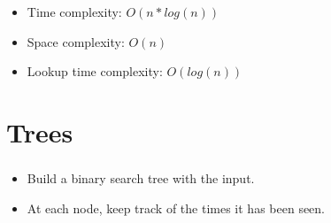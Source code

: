 \documentclass[table]{beamer}
\makeatletter
\newcommand*{\currentname}{\@currentlabelname}
\makeatother
\begin{document}
\begin{frame}
    \frametitle{\currentname}
        \begin{itemize}
            \item Time complexity: $O(n*log(n))$
            \item Space complexity: $O(n)$
            \item Lookup time complexity: $O(log(n))$
        \end{itemize}
\end{frame}
\section{Trees}


\begin{frame}
    \frametitle{\currentname}
    \begin{itemize}
        \item Build a binary search tree with the input.
        \item At each node, keep track of the times it has been seen.
    \end{itemize}
\end{frame}
\end{document}
